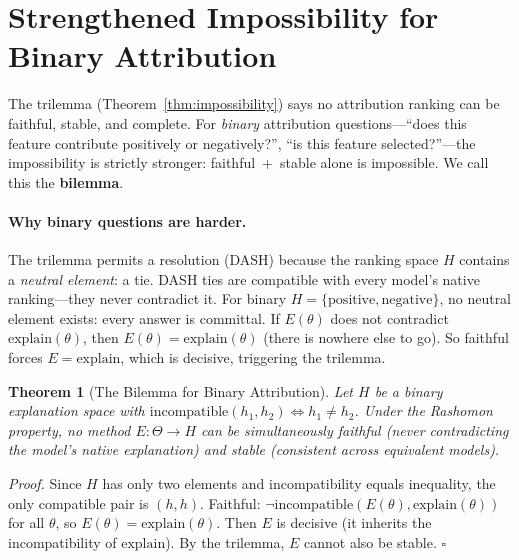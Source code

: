 \documentclass{article}
\newtheorem{theorem}{Theorem}
\begin{document}

\section{Strengthened Impossibility for Binary Attribution}
\label{sec:bilemma}

The trilemma (Theorem~\ref{thm:impossibility}) says no attribution ranking can be faithful, stable, and complete.
For \emph{binary} attribution questions---``does this feature contribute positively or negatively?'', ``is this feature selected?''---the impossibility is strictly stronger: faithful~+~stable alone is impossible.
We call this the \textbf{bilemma}.

\paragraph{Why binary questions are harder.}
The trilemma permits a resolution (DASH) because the ranking space $H$ contains a \emph{neutral element}: a tie.
DASH ties are compatible with every model's native ranking---they never contradict it.
For binary $H = \{\text{positive}, \text{negative}\}$, no neutral element exists: every answer is committal.
If $E(\theta)$ does not contradict $\text{explain}(\theta)$, then $E(\theta) = \text{explain}(\theta)$ (there is nowhere else to go).
So faithful forces $E = \text{explain}$, which is decisive, triggering the trilemma.

\begin{theorem}[The Bilemma for Binary Attribution]\label{thm:bilemma}
Let $H$ be a binary explanation space with $\text{incompatible}(h_1, h_2) \Leftrightarrow h_1 \neq h_2$.
Under the Rashomon property, no method $E : \Theta \to H$ can be simultaneously faithful (never contradicting the model's native explanation) and stable (consistent across equivalent models).
\end{theorem}

\noindent\textit{Proof.}
Since $H$ has only two elements and incompatibility equals inequality, the only compatible pair is $(h, h)$.
Faithful: $\neg\text{incompatible}(E(\theta), \text{explain}(\theta))$ for all $\theta$, so $E(\theta) = \text{explain}(\theta)$.
Then $E$ is decisive (it inherits the incompatibility of $\text{explain}$).
By the trilemma, $E$ cannot also be stable. \hfill$\square$
\end{document}
